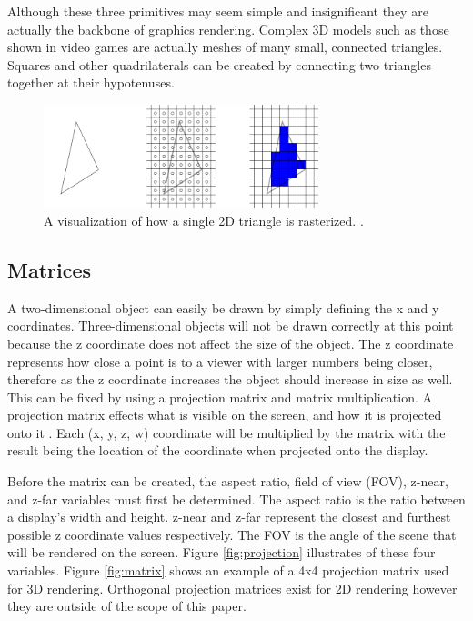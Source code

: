 \documentclass{article}
\begin{document}
Although these three primitives may seem simple and insignificant they are actually the backbone of graphics rendering. Complex 3D models such as those shown in video games are actually meshes of many small, connected triangles. Squares and other quadrilaterals can be created by connecting two triangles together at their hypotenuses.

\begin{figure}[h]
	\centering
	\includegraphics[height=3cm]{triangle-rendering}
	\caption{A visualization of how a single 2D triangle is rasterized. \cite{mckesson2018}.}
	\label{fig:triangle-rendering}
\end{figure}

\subsection{Matrices}
A two-dimensional object can easily be drawn by simply defining the x and y coordinates. Three-dimensional objects will not be drawn correctly at this point because the z coordinate does not affect the size of the object. The z coordinate represents how close a point is to a viewer with larger numbers being closer, therefore as the z coordinate increases the object should increase in size as well. This can be fixed by using a projection matrix and matrix multiplication. A projection matrix effects what is visible on the screen, and how it is projected onto it \cite{sellers2016}. Each (x, y, z, w) coordinate will be multiplied by the matrix with the result being the location of the coordinate when projected onto the display.

Before the matrix can be created, the aspect ratio, field of view (FOV), z-near, and z-far variables must first be determined. The aspect ratio is the ratio between a display's width and height. z-near and z-far represent the closest and furthest possible z coordinate values respectively. The FOV is the angle of the scene that will be rendered on the screen. Figure \ref{fig:projection} illustrates of these four variables. Figure \ref{fig:matrix} shows an example of a 4x4 projection matrix used for 3D rendering. Orthogonal projection matrices exist for 2D rendering however they are outside of the scope of this paper.
\end{document}
